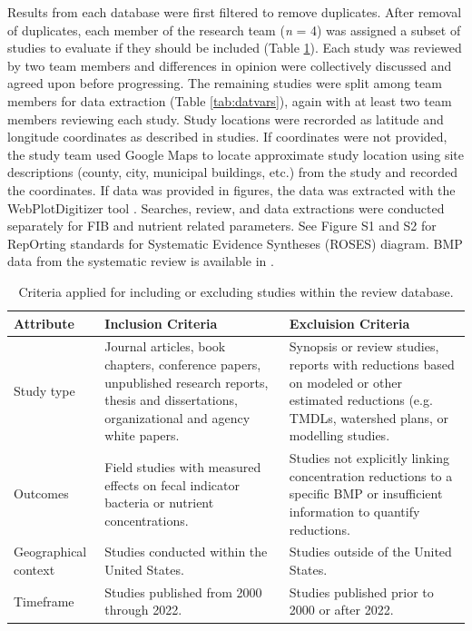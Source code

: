 \documentclass[utf8]{FrontiersinHarvard}
\begin{document}
Results from each database were first filtered to remove duplicates.
After removal of duplicates, each member of the research team (\emph{n} = 4) was assigned a subset of studies to evaluate if they should be included (Table \ref{tab:criteria}).
Each study was reviewed by two team members and differences in opinion were collectively discussed and agreed upon before progressing.
The remaining studies were split among team members for data extraction (Table \ref{tab:datvars}), again with at least two team members reviewing each study.
Study locations were recrorded as latitude and longitude coordinates as described in studies.
If coordinates were not provided, the study team used Google Maps to locate approximate study location using site descriptions (county, city, municipal buildings, etc.) from the study and recorded the coordinates.
If data was provided in figures, the data was extracted with the WebPlotDigitizer tool \citep{rohatgiWebPlotDigitizer2022}.
Searches, review, and data extractions were conducted separately for FIB and nutrient related parameters.
See Figure S1 and S2 for RepOrting standards for Systematic Evidence Syntheses
(ROSES) diagram.
BMP data from the systematic review is available in \citet{kikoyoTWRINPSBMPDB2024}.

\begin{table}

\caption{\label{tab:criteria}Criteria applied for including or excluding studies within the review database.}
\centering
\begin{tabular}[t]{>{\raggedright\arraybackslash}p{5em}>{\raggedright\arraybackslash}p{15em}>{\raggedright\arraybackslash}p{15em}}
\toprule
Attribute & Inclusion Criteria & Excluision Criteria\\
\midrule
Study type & Journal articles, book chapters, conference papers, unpublished research reports, thesis and dissertations, organizational and agency white papers. & Synopsis or review studies, reports with reductions based on modeled or other estimated reductions (e.g. TMDLs, watershed plans, or modelling studies.\\
Outcomes & Field studies with measured effects on fecal indicator bacteria or nutrient concentrations. & Studies not explicitly linking concentration reductions to a specific BMP or insufficient information to quantify reductions.\\
Geographical context & Studies conducted within the United States. & Studies outside of the United States.\\
Timeframe & Studies published from 2000 through 2022. & Studies published prior to 2000 or after 2022.\\
\bottomrule
\end{tabular}
\end{table}
\end{document}
